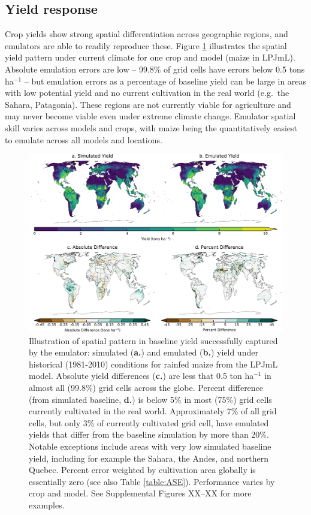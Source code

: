 \documentclass[gmd, manuscript]{copernicus} %
\begin{document}
\subsection{Yield response}
Crop yields show strong spatial differentiation across geographic regions, and emulators are able to readily reproduce these. Figure \ref{fig:map_pattern} illustrates the spatial yield pattern under current climate for one crop and model (maize in LPJmL). Absolute emulation errors are low --  99.8\% of grid cells have errors below 0.5 tons ha$^{-1}$ -- but 
emulation errors as a percentage of baseline yield can be large in areas with low potential yield and no current cultivation in the real world (e.g.\ the Sahara, Patagonia).
These regions are not currently viable for agriculture and may never become viable even under extreme climate change.  
Emulator spatial skill varies across models and crops, with maize being the quantitatively easiest to emulate across all models and locations.

\begin{figure}[ht]
\centering
    \includegraphics[width=16.0cm]{figures/lpjml_maize.png}
    \caption{
    Illustration of spatial pattern in baseline yield successfully captured by the emulator:
    simulated (\textbf{a.}) and emulated (\textbf{b.}) yield under historical (1981-2010) conditions for rainfed maize from the LPJmL model.
    Absolute yield differences (\textbf{c.}) are less that 0.5 ton ha$^{-1}$ in almost all (99.8\%) grid cells across the globe.
    Percent difference (from simulated baseline, \textbf{d.}) is below 5\% in most (75\%) grid cells currently cultivated in the real world.
    Approximately 7\% of all grid cells, but only 3\% of currently cultivated grid cell, have emulated yields that differ from the baseline simulation by more than 20\%.
    Notable exceptions include areas with very low simulated baseline yield, including for example the Sahara, the Andes, and northern Quebec. 
    Percent error weighted by cultivation area globally is essentially zero (see also Table \ref{table:ASE}).
    Performance varies by crop and model. 
    See Supplemental Figures XX--XX for more examples.
    }
   \label{fig:map_pattern}
\end{figure}
\end{document}
